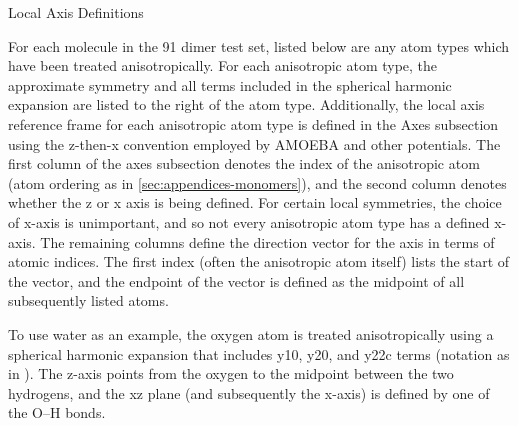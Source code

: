 \begin{section}{Local Axis Definitions}
\label{sec:mastiff-local_axis_defs}

For each molecule in the 91 dimer test set, listed below are any atom types
which have been treated anisotropically. For each anisotropic atom type, the
approximate symmetry and all
terms included in the spherical harmonic expansion are listed to the right of
the atom type. Additionally, the local axis reference frame for each
anisotropic atom type is
defined in the Axes subsection using the z-then-x convention employed by
AMOEBA and other potentials. The first column
of the axes subsection denotes the index of the anisotropic atom (atom
ordering as in \cref{sec:appendices-monomers}), and the second column denotes whether the
z or x axis is being defined. For certain local symmetries, the
choice of x-axis is unimportant, and so not every anisotropic atom type has a
defined x-axis. 
The remaining columns define the direction vector for the
axis in terms of atomic indices. The first index (often
the anisotropic atom itself) lists the start of the vector, and the endpoint
of the vector is defined as the midpoint of all subsequently listed atoms.

To use water as an example, the oxygen atom is treated anisotropically
using a spherical harmonic expansion that includes y10, y20, and y22c terms
(notation as in ). The z-axis points from the oxygen to
the midpoint between the two hydrogens, and the xz plane (and subsequently the
x-axis) is defined by one of
the O--H bonds. 



\end{section}
